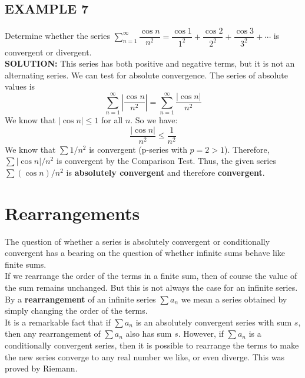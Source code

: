 \documentclass{article}
\theoremstyle{mystyle}
\begin{document}
\subsection*{EXAMPLE 7}
Determine whether the series \( \sum_{n=1}^{\infty} \dfrac{\cos n}{n^2} = \dfrac{\cos 1}{1^2} + \dfrac{\cos 2}{2^2} + \dfrac{\cos 3}{3^2} + \cdots \) is convergent or divergent.\\
\textbf{SOLUTION:}
This series has both positive and negative terms, but it is not an alternating series. We can test for absolute convergence. The series of absolute values is
\[ \sum_{n=1}^{\infty} \left| \dfrac{\cos n}{n^2} \right| = \sum_{n=1}^{\infty} \dfrac{|\cos n|}{n^2} \]
We know that \(|\cos n| \le 1\) for all \(n\). So we have:
\[ \dfrac{|\cos n|}{n^2} \le \dfrac{1}{n^2} \]
We know that \( \sum 1/n^2 \) is convergent (p-series with \(p=2 > 1\)). Therefore, \( \sum |\cos n|/n^2 \) is convergent by the Comparison Test.
Thus, the given series \( \sum (\cos n)/n^2 \) is \textbf{absolutely convergent} and therefore \textbf{convergent}.

\section*{Rearrangements}
The question of whether a series is absolutely convergent or conditionally convergent has a bearing on the question of whether infinite sums behave like finite sums.\\
If we rearrange the order of the terms in a finite sum, then of course the value of the sum remains unchanged. But this is not always the case for an infinite series. By a \textbf{rearrangement} of an infinite series \( \sum a_n \) we mean a series obtained by simply changing the order of the terms.\\
It is a remarkable fact that if \( \sum a_n \) is an absolutely convergent series with sum \(s\), then any rearrangement of \( \sum a_n \) also has sum \(s\). However, if \( \sum a_n \) is a conditionally convergent series, then it is possible to rearrange the terms to make the new series converge to any real number we like, or even diverge. This was proved by Riemann.
\end{document}
